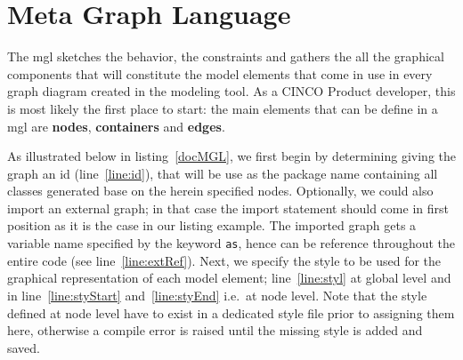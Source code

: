 \section{Meta Graph Language}\label{sec:MGL}

The \acrfull{mgl} sketches the behavior, the constraints and gathers the all the graphical components that will constitute the model elements that come in use in every graph diagram created in the modeling tool. As a CINCO Product developer, this is most likely the first place to start: the main elements that can be define in a \acrshort{mgl} are \textbf{nodes}, \textbf{containers} and \textbf{edges}. 

As illustrated below in listing~\ref{docMGL}, we first begin by determining giving the graph an id (line~\ref{line:id}), that will be use as the package name containing all classes generated base on the herein specified nodes. Optionally, we could also import an external graph; in that case the import statement should come in first position as it is the case in our listing example. The imported graph gets a variable name specified by the keyword \lstinline[language=MGL]{as}, hence can be reference throughout the entire code (see line~\ref{line:extRef}). Next, we specify the style to be used for the graphical representation of each model element; line~\ref{line:styl} at global level and in line~\ref{line:styStart} and~\ref{line:styEnd} i.e.\ at node level. Note that the style defined at node level have to exist in a dedicated style file prior to assigning them here, otherwise a compile error is raised until the missing style is added and saved.

